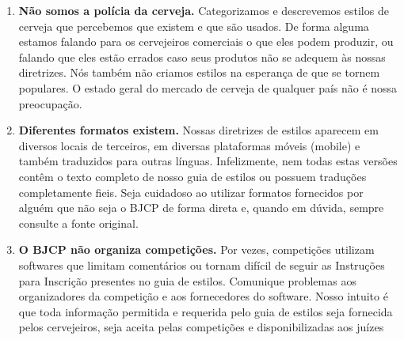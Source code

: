 \begin{enumerate}
\item \textbf{Não somos a polícia da cerveja.} Categorizamos e descrevemos estilos de cerveja que percebemos que existem e que são usados. De forma alguma estamos falando para os cervejeiros comerciais o que eles podem produzir, ou falando que eles estão errados caso seus produtos não se adequem às nossas diretrizes. Nós também não criamos estilos na esperança de que se tornem populares. O estado geral do mercado de cerveja de qualquer país não é nossa preocupação.
\item \textbf{Diferentes formatos existem.} Nossas diretrizes de estilos aparecem em diversos locais de terceiros, em diversas plataformas móveis (mobile) e também traduzidos para outras línguas. Infelizmente, nem todas estas versões contêm o texto completo de nosso guia de estilos ou possuem traduções completamente fieis. Seja cuidadoso ao utilizar formatos fornecidos por alguém que não seja o BJCP de forma direta e, quando em dúvida, sempre consulte a fonte original.
\item \textbf{O BJCP não organiza competições.} Por vezes, competições utilizam softwares que limitam comentários ou tornam difícil de seguir as Instruções para Inscrição presentes no guia de estilos. Comunique problemas aos organizadores da competição e aos fornecedores do software. Nosso intuito é que toda informação permitida e requerida pelo guia de estilos seja fornecida pelos cervejeiros, seja aceita pelas competições e disponibilizadas aos juízes
\end{enumerate}
